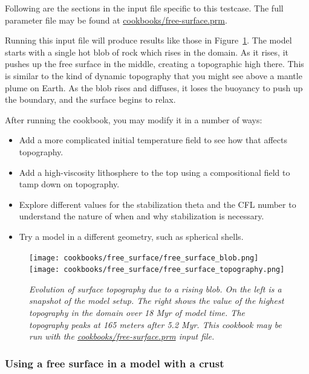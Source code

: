 \documentclass{article}
\begin{document}
Following are the sections in the input file specific to this testcase.  The full parameter
file may be found at \url{cookbooks/free-surface.prm}.



Running this input file will produce results like those in Figure~\ref{fig:freesurface}.
The model starts with a single hot blob of rock which rises in the domain.  As it 
rises, it pushes up the free surface in the middle, creating a topographic high there.
This is similar to the kind of dynamic topography that you might see above a mantle 
plume on Earth.  As the blob rises and diffuses, it loses the buoyancy to push up 
the boundary, and the surface begins to relax.

After running the cookbook, you may modify it in a number of ways:
\begin{itemize}
\item Add a more complicated initial temperature field to see how that affects topography.
\item Add a high-viscosity lithosphere to the top using a compositional field to tamp down on topography.
\item Explore different values for the stabilization theta and the CFL number to understand the nature of when and why stabilization is necessary.
\item Try a model in a different geometry, such as spherical shells.
\end{itemize}

\begin{figure}
  \centering
  \texttt{[image: cookbooks/free\_surface/free\_surface\_blob.png]}
  \hfill
  \texttt{[image: cookbooks/free\_surface/free\_surface\_topography.png]}
  \caption{\it Evolution of surface topography due to a rising blob.  On the left is a 
           snapshot of the model setup.  The right shows the value of the highest 
           topography in the domain over 18 Myr of model time.  The topography peaks
           at 165 meters after 5.2 Myr.  This cookbook may be run with the
           \url{cookbooks/free-surface.prm} input file.}
  \label{fig:freesurface}
\end{figure}


\subsubsection{Using a free surface in a model with a crust}
\label{sec:cookbooks-freesurfaceWC}
\end{document}
